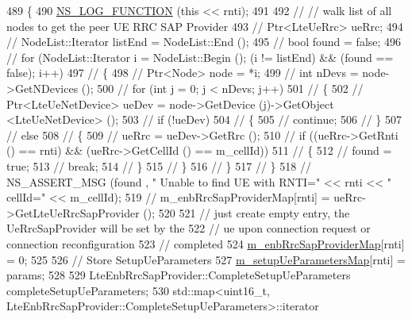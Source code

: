 \begin{DoxyCode}
489 \{
490   \hyperlink{log-macros-disabled_8h_a90b90d5bad1f39cb1b64923ea94c0761}{NS\_LOG\_FUNCTION} (\textcolor{keyword}{this} << rnti);
491 
492   \textcolor{comment}{// // walk list of all nodes to get the peer UE RRC SAP Provider}
493   \textcolor{comment}{// Ptr<LteUeRrc> ueRrc;}
494   \textcolor{comment}{// NodeList::Iterator listEnd = NodeList::End ();}
495   \textcolor{comment}{// bool found = false;}
496   \textcolor{comment}{// for (NodeList::Iterator i = NodeList::Begin (); (i != listEnd) && (found == false); i++)}
497   \textcolor{comment}{//   \{}
498   \textcolor{comment}{//     Ptr<Node> node = *i;}
499   \textcolor{comment}{//     int nDevs = node->GetNDevices ();}
500   \textcolor{comment}{//     for (int j = 0; j < nDevs; j++)}
501   \textcolor{comment}{//       \{}
502   \textcolor{comment}{//         Ptr<LteUeNetDevice> ueDev = node->GetDevice (j)->GetObject <LteUeNetDevice> ();}
503   \textcolor{comment}{//         if (!ueDev)}
504   \textcolor{comment}{//           \{}
505   \textcolor{comment}{//             continue;}
506   \textcolor{comment}{//           \}}
507   \textcolor{comment}{//         else}
508   \textcolor{comment}{//           \{}
509   \textcolor{comment}{//             ueRrc = ueDev->GetRrc ();}
510   \textcolor{comment}{//             if ((ueRrc->GetRnti () == rnti) && (ueRrc->GetCellId () == m\_cellId))}
511   \textcolor{comment}{//               \{}
512   \textcolor{comment}{//              found = true;}
513   \textcolor{comment}{//              break;}
514   \textcolor{comment}{//               \}}
515   \textcolor{comment}{//           \}}
516   \textcolor{comment}{//       \}}
517   \textcolor{comment}{//   \}}
518   \textcolor{comment}{// NS\_ASSERT\_MSG (found , " Unable to find UE with RNTI=" << rnti << " cellId=" << m\_cellId);}
519   \textcolor{comment}{// m\_enbRrcSapProviderMap[rnti] = ueRrc->GetLteUeRrcSapProvider ();}
520 
521   \textcolor{comment}{// just create empty entry, the UeRrcSapProvider will be set by the}
522   \textcolor{comment}{// ue upon connection request or connection reconfiguration}
523   \textcolor{comment}{// completed }
524   \hyperlink{classns3_1_1LteEnbRrcProtocolReal_af4e248099c293306dc96e00865ae9347}{m\_enbRrcSapProviderMap}[rnti] = 0;
525 
526   \textcolor{comment}{// Store SetupUeParameters}
527   \hyperlink{classns3_1_1LteEnbRrcProtocolReal_ad6da86f1b3a0f7adf856b4141d587c46}{m\_setupUeParametersMap}[rnti] = params;
528 
529   LteEnbRrcSapProvider::CompleteSetupUeParameters completeSetupUeParameters;
530   std::map<uint16\_t, LteEnbRrcSapProvider::CompleteSetupUeParameters>::iterator 

\end{DoxyCode}
